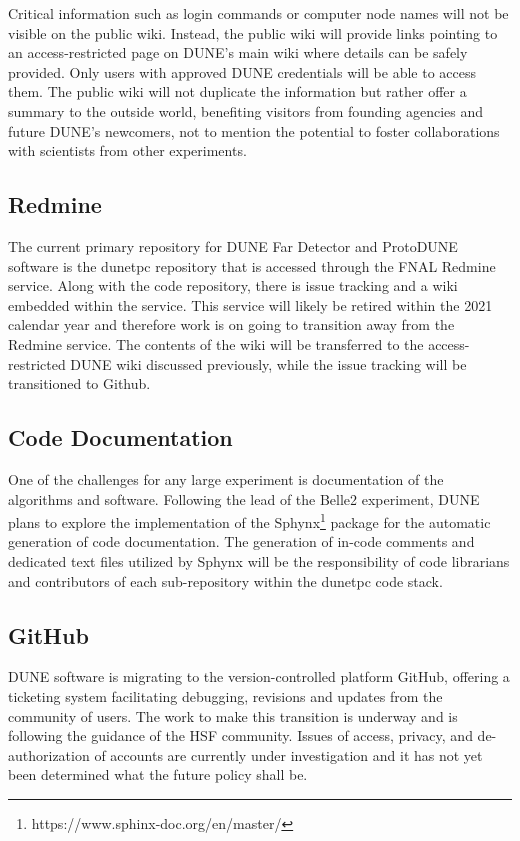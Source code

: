 \documentclass[../main-v1.tex]{subfiles}
\begin{document}
Critical information such as login commands or computer node names will not be visible on the public wiki. Instead, the public wiki will provide links pointing to an access-restricted page on DUNE’s main wiki where details can be safely provided. Only users with approved DUNE credentials will be able to access them. The public wiki will not duplicate the information but rather offer a summary to the outside world, benefiting visitors from founding agencies and future DUNE’s newcomers, not to mention the potential to foster collaborations with scientists from other experiments.

\subsection{Redmine}
The current primary repository for DUNE Far Detector and ProtoDUNE software is the dunetpc repository that is accessed through the FNAL Redmine service. Along with the code repository, there is issue tracking and a wiki embedded within the service. This service will likely be retired within the 2021 calendar year and therefore work is on going to transition away from the Redmine service. The contents of the wiki will be transferred to the access-restricted DUNE wiki discussed previously, while the issue tracking will be transitioned to Github.

\subsection{Code Documentation}
One of the challenges for any large experiment is documentation of the algorithms and software. Following the lead of the Belle2 experiment, DUNE plans to explore the implementation of the Sphynx\footnote{https://www.sphinx-doc.org/en/master/} package for the automatic generation of code documentation. The generation of in-code comments and dedicated text files utilized by Sphynx will be the responsibility of code librarians and contributors of each sub-repository within the dunetpc code stack.

\subsection{GitHub}
DUNE software is migrating to the version-controlled platform GitHub, offering a ticketing system facilitating debugging, revisions and updates from the community of users. The work to make this transition is underway and is following the guidance of the HSF community. Issues of access, privacy, and de-authorization of accounts are currently under investigation and it has not yet been determined what the future policy shall be.
\end{document}
